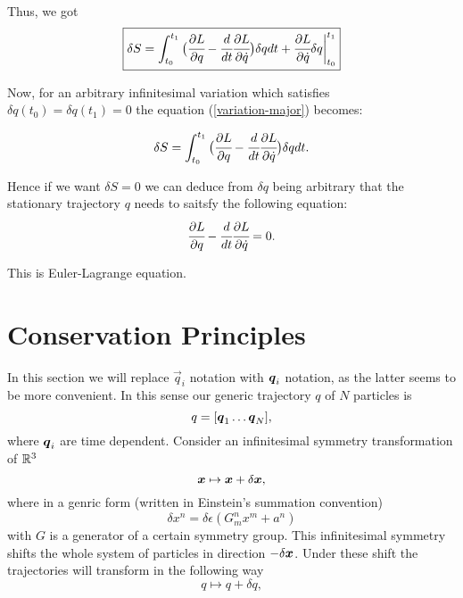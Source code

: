 \documentclass[main.tex]{subfiles}
\begin{document}
Thus, we got
\begin{equation}
\label{variation-major}
\boxed
{
\delta S = \int_{t_0}^{t_1} \big(\cfrac{\partial L}{\partial q} - \cfrac{d}{dt} \cfrac{\partial L}{\partial \dot{q}}\big)\delta qdt + \cfrac{\partial L}{\partial \dot{q}} \delta q \bigg|^{t_1}_{t_0}
}
\end{equation}

Now, for an arbitrary infinitesimal variation which satisfies $\delta q(t_0) = \delta q(t_1) = 0$ the equation (\ref{variation-major}) becomes:

\begin{equation}
\delta S = \int_{t_0}^{t_1} \big(\cfrac{\partial L}{\partial q} - \cfrac{d}{dt} \cfrac{\partial L}{\partial \dot{q}}\big)\delta qdt.
\end{equation}

Hence if we want $\delta S = 0$ we can deduce from $\delta q$ being arbitrary that the stationary trajectory $q$ needs to saitsfy the following equation:
\begin{equation}
\cfrac{\partial L}{\partial q} - \cfrac{d}{dt} \cfrac{\partial L}{\partial \dot{q}} = 0.
\end{equation}

This is Euler-Lagrange equation.

\section{Conservation Principles}
In this section we will replace $\vec{q}_i$ notation with $\boldsymbol{q}_i$ notation, as the latter seems to be more convenient. In this sense our generic trajectory $q$ of $N$ particles is 
\begin{equation}
q = [\boldsymbol{q}_1 \dots \boldsymbol{q}_N],
\end{equation}
where $\boldsymbol{q}_i$ are time dependent.
Consider an infinitesimal symmetry transformation of $\mathbb{R}^3$
\begin{equation}
\boldsymbol{x} \mapsto \boldsymbol{x} + \delta\boldsymbol{x},
\end{equation}
where in a genric form (written in Einstein's summation convention)
\begin{equation}
\delta x^n = \delta\epsilon(G^n_m x^m + a^n)
\end{equation}
with $G$ is a generator of a certain symmetry group.
This infinitesimal symmetry shifts the whole system of particles in direction $-\delta \boldsymbol{x}$.
Under these shift the trajectories will transform in the following way
\begin{equation}
q \mapsto q + \delta q,
\end{equation} 
\end{document}
